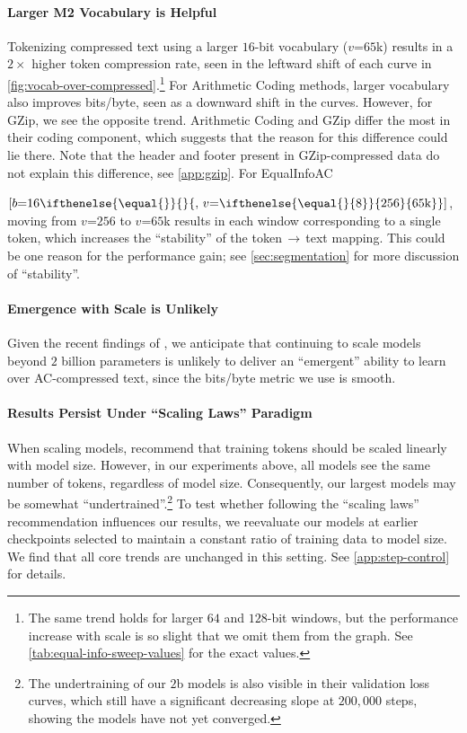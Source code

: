 \paragraph{Larger M2 Vocabulary is Helpful} Tokenizing compressed text using a larger $16$-bit vocabulary ($v\mathord{=}65$k) results in a $2\times$ higher token compression rate, seen in the leftward shift of each curve in \ref{fig:vocab-over-compressed}.\footnote{The same trend holds for larger $64$ and $128$-bit windows, but the performance increase with scale is so slight that we omit them from the graph. See \ref{tab:equal-info-sweep-values} for the exact values.} For Arithmetic Coding methods, larger vocabulary also improves bits/byte, seen as a downward shift in the curves. However, for GZip, we see the opposite trend. Arithmetic Coding and GZip differ the most in their coding component, which suggests that the reason for this difference could lie there. Note that the header and footer present in GZip-compressed data do not explain this difference, see \ref{app:gzip}\@. For EqualInfoAC

  {$[b\mathord{=}16\ifthenelse{\equal{}}{}{,\,v\mathord{=}\ifthenelse{\equal{}{8}}{256}{65\text{k}}}]$}, moving from $v\mathord{=}256$ to $v\mathord{=}65$k results in each window corresponding to a single token, which increases the ``stability'' of the token\,$\rightarrow$\,text mapping. This could be one reason for the performance gain; see \ref{sec:segmentation} for more discussion of ``stability''.

\paragraph{Emergence with Scale is Unlikely} Given the recent findings of \citet{schaefferAreEmergentAbilities2023}, we anticipate that continuing to scale models beyond $2$ billion parameters is unlikely to deliver an ``emergent'' ability to learn over AC-compressed text, since the bits/byte metric we use is smooth.

\paragraph{Results Persist Under ``Scaling Laws'' Paradigm} When scaling models, \citet{hoffmann2022training} recommend that training tokens should be scaled linearly with model size. However, in our experiments above, all models see the same number of tokens, regardless of model size. Consequently, our largest models may be somewhat ``undertrained''.\footnote{The undertraining of our $2$b models is also visible in their validation loss curves, which still have a significant decreasing slope at $200{,}000$ steps, showing the models have not yet converged.} To test whether following the ``scaling laws'' recommendation influences our results, we reevaluate our models at earlier checkpoints selected to maintain a constant ratio of training data to model size. We find that all core trends are unchanged in this setting. See \ref{app:step-control} for details.

